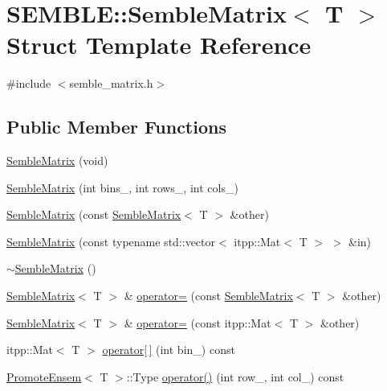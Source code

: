 \hypertarget{structSEMBLE_1_1SembleMatrix}{}\section{S\+E\+M\+B\+LE\+:\+:Semble\+Matrix$<$ T $>$ Struct Template Reference}
\label{structSEMBLE_1_1SembleMatrix}


{\ttfamily \#include $<$semble\+\_\+matrix.\+h$>$}

\subsection*{Public Member Functions}
\begin{DoxyCompactItemize}
\item 
\mbox{\hyperlink{structSEMBLE_1_1SembleMatrix_a870fcbb89e1fd8f5ad2404edc58b53d6}{Semble\+Matrix}} (void)
\item 
\mbox{\hyperlink{structSEMBLE_1_1SembleMatrix_afaf672b694d5af975145b48ede17dfe5}{Semble\+Matrix}} (int bins\+\_\+, int rows\+\_\+, int cols\+\_\+)
\item 
\mbox{\hyperlink{structSEMBLE_1_1SembleMatrix_a11b1a303d2acda92882da3328762c9d9}{Semble\+Matrix}} (const \mbox{\hyperlink{structSEMBLE_1_1SembleMatrix}{Semble\+Matrix}}$<$ T $>$ \&other)
\item 
\mbox{\hyperlink{structSEMBLE_1_1SembleMatrix_ae0777794c361366bc0840e443e60d18b}{Semble\+Matrix}} (const typename std\+::vector$<$ itpp\+::\+Mat$<$ T $>$ $>$ \&in)
\item 
\mbox{\hyperlink{structSEMBLE_1_1SembleMatrix_a58bec7f5fd4b0169dfbbb472981e9dee}{$\sim$\+Semble\+Matrix}} ()
\item 
\mbox{\hyperlink{structSEMBLE_1_1SembleMatrix}{Semble\+Matrix}}$<$ T $>$ \& \mbox{\hyperlink{structSEMBLE_1_1SembleMatrix_a9ccb068428d7a8bb19cfb75ca2efbf09}{operator=}} (const \mbox{\hyperlink{structSEMBLE_1_1SembleMatrix}{Semble\+Matrix}}$<$ T $>$ \&other)
\item 
\mbox{\hyperlink{structSEMBLE_1_1SembleMatrix}{Semble\+Matrix}}$<$ T $>$ \& \mbox{\hyperlink{structSEMBLE_1_1SembleMatrix_a8f29a7755be1f2cad035c0fcafc522f5}{operator=}} (const itpp\+::\+Mat$<$ T $>$ \&other)
\item 
itpp\+::\+Mat$<$ T $>$ \mbox{\hyperlink{structSEMBLE_1_1SembleMatrix_adb4d8183e55a5ff64f3cf8dd6cc21d92}{operator\mbox{[}$\,$\mbox{]}}} (int bin\+\_\+) const
\item 
\mbox{\hyperlink{structSEMBLE_1_1PromoteEnsem}{Promote\+Ensem}}$<$ T $>$\+::Type \mbox{\hyperlink{structSEMBLE_1_1SembleMatrix_ac971ccfb246830b41dc70f8003281cae}{operator()}} (int row\+\_\+, int col\+\_\+) const

\end{DoxyCompactItemize}
